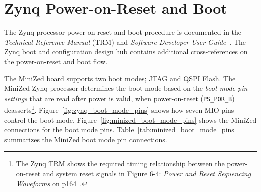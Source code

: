 \section{Zynq Power-on-Reset and Boot}
\label{sec:zynq_boot}

The Zynq processor power-on-reset and boot procedure is documented in the
\emph{Technical Reference Manual} (TRM) and \emph{Software Developer
User Guide}~\cite{Xilinx_UG585_2018,Xilinx_UG821_2015}. The Zynq
\href{https://www.xilinx.com/support/documentation-navigation/design-hubs/dh0053-zynq-7000-boot-and-config-hub.html}{boot and configuration}
design hub contains additional cross-references on the power-on-reset
and boot flow.

The MiniZed board supports two boot modes; JTAG and QSPI Flash.
%
The MiniZed Zynq processor determines the boot mode based on the
\emph{boot mode pin settings} that are read after power is valid,
when power-on-reset (\verb+PS_POR_B+) deasserts\footnote{The Zynq TRM
shows the required timing relationship between the power-on-reset
and system reset signals in Figure 6-4: \emph{Power and Reset Sequencing
Waveforms} on p164~\cite{Xilinx_UG585_2018}.}.
%
Figure~\ref{fig:zynq_boot_mode_pins} shows how seven MIO pins control
the boot mode. Figure~\ref{fig:minized_boot_mode_pins} shows the
MiniZed connections for the boot mode pins.
Table~\ref{tab:minized_boot_mode_pins} summarizes the MiniZed boot mode
pin connections.

